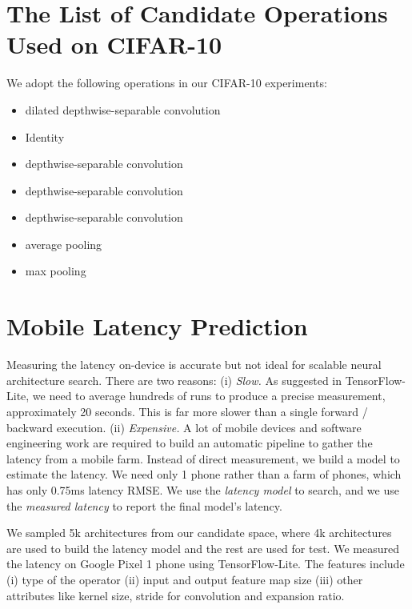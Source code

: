 \documentclass{article} \usepackage{iclr2019_conference,times}
\begin{document}



\newpage

\appendix
\section{The List of Candidate Operations Used on CIFAR-10}
We adopt the following  operations in our CIFAR-10 experiments:
{\small
\begin{itemize}
	\setlength\itemsep{0.pt}
	\item  dilated depthwise-separable convolution
	\item Identity
	\item  depthwise-separable convolution 
	\item  depthwise-separable convolution
	\item  depthwise-separable convolution
    \item  average pooling
    \item  max pooling
\end{itemize}
}

\section{Mobile Latency Prediction}\label{sec:latency_prediction_model}
Measuring the latency on-device is accurate but not ideal for scalable neural architecture search. There are two reasons: (i) \emph{Slow.} As suggested in TensorFlow-Lite, 
we need to average hundreds of runs to produce a precise measurement, approximately 20 seconds. This is far more slower than a single forward / backward execution. (ii) \emph{Expensive.} A lot of mobile devices and software engineering work are required to build an automatic pipeline to gather the latency from a mobile farm. Instead of direct measurement, we build a model to estimate the latency. We need only 1 phone rather than a farm of phones, which has only 0.75ms latency RMSE. We use the \emph{latency model} to search, and we use the \emph{measured latency} to report the final model's latency. 

We sampled 5k architectures from our candidate space, where 4k architectures are used to build the latency model and the rest are used for test. We measured the latency on Google Pixel 1 phone using TensorFlow-Lite. The features include (i) type of the operator (ii) input and output feature map size (iii) other attributes like kernel size, stride for convolution and expansion ratio. 
\end{document}
